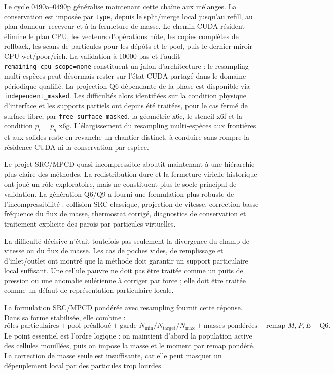 \documentclass[11pt,a4paper]{article}
\begin{document}
Le cycle 0490a--0490p généralise maintenant cette chaîne aux mélanges. La conservation est imposée par \texttt{type}, depuis le split/merge local jusqu'au refill, au plan donneur--receveur et à la fermeture de masse. Le chemin CUDA résident élimine le plan CPU, les vecteurs d'opérations hôte, les copies complètes de rollback, les scans de particules pour les dépôts et le pool, puis le dernier miroir CPU wet/poor/rich. La validation à 10000 pas et l'audit \texttt{remaining\_cpu\_scope=none} constituent un jalon d'architecture : le resampling multi-espèces peut désormais rester sur l'état CUDA partagé dans le domaine périodique qualifié. La projection Q6 dépendante de la phase est disponible via \texttt{independent\_masked}. Les difficultés alors identifiées sur la condition physique d'interface et les supports partiels ont depuis été traitées, pour le cas fermé de surface libre, par \texttt{free\_surface\_masked}, la géométrie x6c, le stencil x6f et la condition $p_l=p_g$ x6g. L'élargissement du resampling multi-espèces aux frontières et aux solides reste en revanche un chantier distinct, à conduire sans rompre la résidence CUDA ni la conservation par espèce.

Le projet SRC/MPCD quasi-incompressible aboutit maintenant à une hiérarchie plus claire des méthodes. La redistribution dure et la fermeture virielle historique ont joué un rôle exploratoire, mais ne constituent plus le socle principal de validation. La génération Q6/Q9 a fourni une formulation plus robuste de l'incompressibilité : collision SRC classique, projection de vitesse, correction basse fréquence du flux de masse, thermostat corrigé, diagnostics de conservation et traitement explicite des parois par particules virtuelles.

La difficulté décisive n'était toutefois pas seulement la divergence du champ de vitesse ou du flux de masse. Les cas de poches vides, de remplissage et d'inlet/outlet ont montré que la méthode doit garantir un support particulaire local suffisant. Une cellule pauvre ne doit pas être traitée comme un puits de pression ou une anomalie eulérienne à corriger par force ; elle doit être traitée comme un défaut de représentation particulaire locale.

La formulation SRC/MPCD pondérée avec resampling fournit cette réponse. Dans sa forme stabilisée, elle combine :
\begin{equation}
  \text{rôles particulaires}
  + \text{pool préalloué}
  + \text{garde }N_{\min}/N_{\mathrm{target}}/N_{\max}
  + \text{masses pondérées}
  + \text{remap }M,P,E
  + \text{Q6}.
\end{equation}
Le point essentiel est l'ordre logique : on maintient d'abord la population active des cellules mouillées, puis on impose la masse et le moment par remap pondéré. La correction de masse seule est insuffisante, car elle peut masquer un dépeuplement local par des particules trop lourdes.
\end{document}
